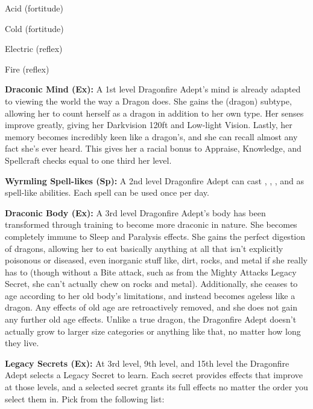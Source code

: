 \begin{itemize*}
\item Acid (fortitude)
\item Cold (fortitude)
\item Electric (reflex)
\item Fire (reflex)
\end{itemize*}

\textbf{Draconic Mind (Ex):} A 1st level Dragonfire Adept's mind is already adapted to viewing the world the way a Dragon does. She gains the (dragon) subtype, allowing her to count herself as a dragon in addition to her own type. Her senses improve greatly, giving her Darkvision 120ft and Low-light Vision. Lastly, her memory becomes incredibly keen like a dragon's, and she can recall almost any fact she's ever heard. This gives her a racial bonus to Appraise, Knowledge, and Spellcraft checks equal to one third her level.

\textbf{Wyrmling Spell-likes (Sp):} A 2nd level Dragonfire Adept can cast , , , and  as spell-like abilities. Each spell can be used once per day.

\textbf{Draconic Body (Ex):} A 3rd level Dragonfire Adept's body has been transformed through training to become more draconic in nature. She becomes completely immune to Sleep and Paralysis effects. She gains the perfect digestion of dragons, allowing her to eat basically anything at all that isn't explicitly poisonous or diseased, even inorganic stuff like, dirt, rocks, and metal if she really has to (though without a Bite attack, such as from the Mighty Attacks Legacy Secret, she can't actually chew on rocks and metal). Additionally, she ceases to age according to her old body's limitations, and instead becomes ageless like a dragon. Any effects of old age are retroactively removed, and she does not gain any further old age effects. Unlike a true dragon, the Dragonfire Adept doesn't actually grow to larger size categories or anything like that, no matter how long they live.

\textbf{Legacy Secrets (Ex):} At 3rd level, 9th level, and 15th level the Dragonfire Adept selects a Legacy Secret to learn. Each secret provides effects that improve at those levels, and a selected secret grants its full effects no matter the order you select them in. Pick from the following list:

